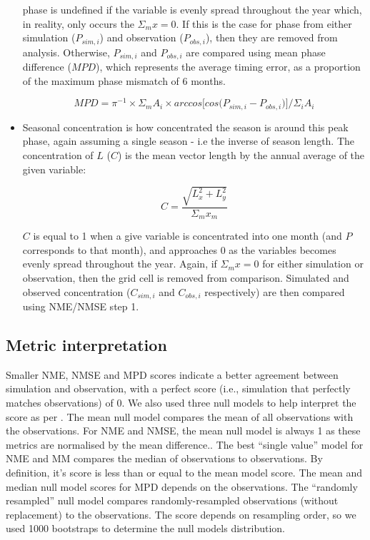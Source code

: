 \begin{itemize}
phase is undefined if the variable  is evenly spread throughout the year which, in reality, only occurs the $\Sigma_m x = 0$. If this is the case for phase from either simulation ($P_{sim, i}$) and observation ($P_{obs, i}$), then they are removed from analysis. Otherwise, $P_{sim, i}$ and $P_{obs, i}$ are compared using mean phase difference ($MPD$), which represents the average timing error, as a proportion of the maximum phase mismatch of 6 months.

\begin{equation}
    MPD = \pi^{-1} \times \Sigma_m A_i \times arccos \big[ cos \big(P_{sim, i} - P_{obs, i} \big) \big] / \Sigma_i A_i 
\end{equation}

    \item Seasonal concentration is how concentrated the season is around this peak phase, again assuming a single season - i.e the inverse of season length. The concentration of $L$ ($C$) is the mean vector length by the annual average of the given variable:

\begin{equation}
    C = \frac{\sqrt{L_x^2 + L_y^2}}{\Sigma_m x_m}
\end{equation}

$C$ is equal to 1 when a give variable is concentrated into one month (and $P$ corresponds to that month), and approaches 0 as the variables becomes evenly spread throughout the year. Again, if $\Sigma_m x = 0$ for either simulation or observation, then the grid cell is removed from comparison. Simulated and observed concentration ($C_{sim, i}$ and $C_{obs, i}$ respectively) are then compared using NME/NMSE step 1.

\end{itemize}

\subsection{Metric interpretation}
Smaller NME, NMSE and MPD scores indicate a better agreement between simulation and observation, with a perfect score (i.e., simulation that perfectly matches observations) of 0. We also used three null models to help interpret the score as per \citet{Burton2019-by, Kelley2019-yu}. The mean null model compares the mean of all observations with the observations. For NME and NMSE, the mean null model is always 1 as these metrics are normalised by the mean difference.. The best “single value” model for NME and MM compares the median of observations to observations. By definition, it’s score is less than or equal to the mean model score. The mean and median null model scores for MPD depends on the observations. The “randomly resampled” null model compares randomly-resampled observations (without replacement) to the observations. The score depends on resampling order, so we used 1000 bootstraps to determine the null models distribution. 


